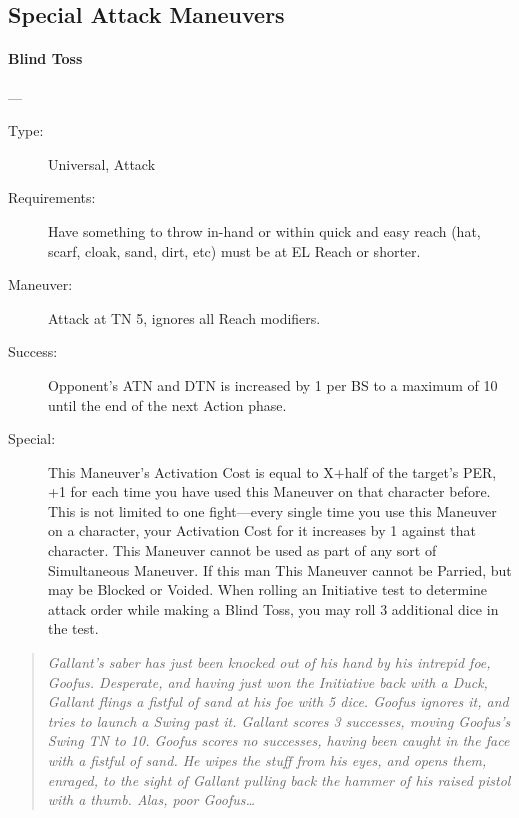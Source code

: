 \documentclass[oneside,11pt,english]{book}
\begin{document}
\subsection{Special Attack Maneuvers}
\paragraph{\large\label{man:Blind Toss}Blind Toss}---\quad{\large[x+Variable]}
\vspace{-10pt}\begin{description} 
\item [Type:] Universal, Attack 
\item [Requirements:] Have something to throw in-hand or within quick and easy reach (hat, scarf, cloak, sand, 
dirt, etc) must be at EL Reach or shorter. 
\item [Maneuver:] Attack at TN 5, ignores all Reach modifiers. 
\item [Success:] Opponent's ATN and DTN is increased by 1 per BS to a maximum of 10 until the end of the 
next Action phase. 
\item [Special:] This Maneuver’s Activation Cost is equal to X+half of the target's PER, +1 for each time you 
have used this Maneuver on that character before. This is not limited to one fight—every single time you 
use this Maneuver on a character, your Activation Cost for it increases by 1 against that character. 
This Maneuver cannot be used as part of any sort of Simultaneous Maneuver. 
If this man %
This Maneuver cannot be Parried, but may be Blocked or Voided. 
When rolling an Initiative test to determine attack order while making a Blind Toss, you may roll 3 
additional dice in the test.
\end{description}
\begin{quotation}
\emph{Gallant’s saber has just been knocked out of his hand by his intrepid foe, Goofus. Desperate, and having just won the Initiative 
back with a Duck, Gallant flings a fistful of sand at his foe with 5 dice. Goofus ignores it, and tries to launch a Swing past it. 
Gallant scores 3 successes, moving Goofus’s Swing TN to 10. Goofus scores no successes, having been caught in the face with a 
fistful of sand. He wipes the stuff from his eyes, and opens them, enraged, to the sight of Gallant pulling back the hammer of his 
raised pistol with a thumb. Alas, poor Goofus\ldots}
\end{quotation}
\end{document}
